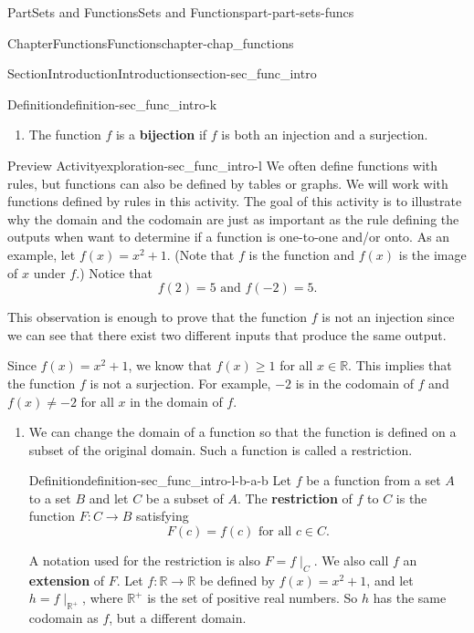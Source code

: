 \documentclass[oneside,10pt,]{book}
\newcommand{\terminology}[1]{\textbf{#1}}
\numberwithin{equation}{chapter}
\newcommand{\R}{\mathbb{R}}
\begin{document}
\begin{partptx}{Part}{Sets and Functions}{}{Sets and Functions}{}{}{part-part-sets-funcs}
\begin{chapterptx}{Chapter}{Functions}{}{Functions}{}{}{chapter-chap_functions}
\begin{sectionptx}{Section}{Introduction}{}{Introduction}{}{}{section-sec_func_intro}
\begin{definition}{Definition}{}{definition-sec_func_intro-k}
\begin{enumerate}
\item{}The function \(f\) is a \terminology{bijection} if \(f\) is both an injection and a surjection.%
\end{enumerate}
%
\end{definition}
\begin{exploration}{Preview Activity}{}{exploration-sec_func_intro-l}%
We often define functions with rules, but functions can also be defined by tables or graphs. We will work with functions defined by rules in this activity. The goal of this activity is to illustrate why the domain and the codomain are just as important as the rule defining the outputs when want to determine if a function is one-to-one and\slash{}or onto. As an example, let \(f(x) = x^2+1\). (Note that \(f\) is the function and \(f(x)\) is the image of \(x\) under \(f\).) Notice that%
\begin{equation*}
f(2) = 5 \text{ and }  f(-2) = 5\text{.}
\end{equation*}
%
\par
This observation is enough to prove that the function \(f\) is not an injection since we can see that there exist two different inputs that produce the same output.%
\par
Since \(f(x) = x^2 + 1\), we know that \(f(x) \geq 1\) for all \(x \in \R\). This implies that the function \(f\) is not a surjection. For example, \(-2\) is in the codomain of \(f\) and \(f(x) \neq -2\) for all \(x\) in the domain of \(f\).%
\begin{enumerate}[font=\bfseries,label=(\alph*),ref=\alph*]%
\item{}We can change the domain of a function so that the function is defined on a subset of the original domain. Such a function is called a restriction.%
\begin{definition}{Definition}{}{definition-sec_func_intro-l-b-a-b}%
%
Let \(f\) be a function from a set \(A\) to a set \(B\) and let \(C\) be a subset of \(A\). The \terminology{restriction} of \(f\) to \(C\) is the function \(F: C \to B\) satisfying%
\begin{equation*}
F(c) = f(c) \text{ for all }  c \in C\text{.}
\end{equation*}
%
\end{definition}
A notation used for the restriction is also \(F = f\mid_C\). We also call \(f\) an \terminology{extension} of \(F\). Let \(f: \R \to \R\) be defined by \(f(x) = x^2+1\), and let \(h = f \mid_{\R^+}\), where \(\R^+\) is the set of positive real numbers. So \(h\) has the same codomain as \(f\), but a different domain.%

\end{enumerate}
\end{exploration}
\end{sectionptx}
\end{chapterptx}
\end{partptx}
\end{document}
